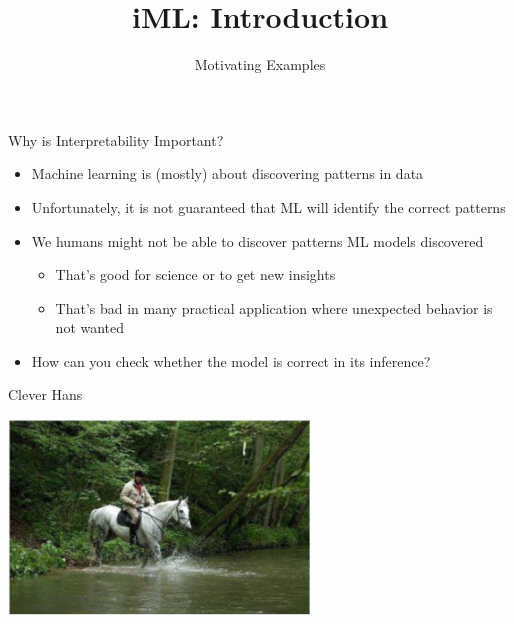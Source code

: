 \documentclass[aspectratio=169]{../latex_main/tntbeamer}  %
\title[Introduction]{iML: Introduction}
\subtitle{Motivating Examples}
\begin{document}
	
	\maketitle

\begin{frame}[c]{Why is Interpretability Important?}
	
	\begin{itemize}
	    \item Machine learning is (mostly) about discovering patterns in data
	    \item Unfortunately, it is not guaranteed that ML will identify the correct patterns
	    \pause
	    \medskip
	    \item We humans might not be able to discover patterns ML models discovered
	    \begin{itemize}
	        \item That's good for science or to get new insights
	        \item That's bad in many practical application where unexpected behavior is not wanted
	    \end{itemize}
	    \medskip
	    \pause
	    \item \alert{How can you check whether the model is correct in its inference?}
	\end{itemize}
	
\end{frame}

\begin{frame}[c]{Clever Hans }
	
	\centering
	\includegraphics[width=0.6\textwidth]{w01_introduction/figure/horse_without_label.PNG}
	
\end{frame}
\end{document}
